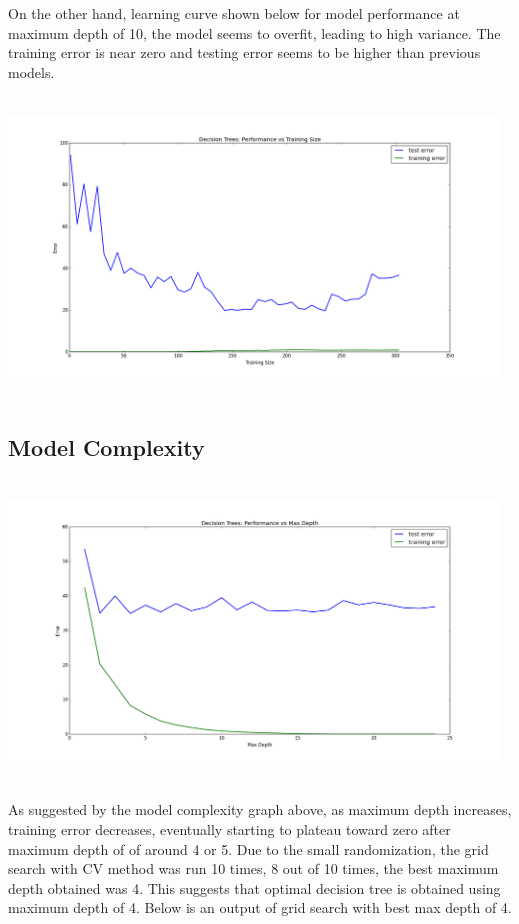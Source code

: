 \documentclass[12pt, letterpaper]{article}
\begin{document}
On the other hand, learning curve shown below for model performance at maximum depth of 10, the model seems to overfit, leading to high variance. The training error is near zero and testing error seems to be higher than previous models.

\begin{center}
\includegraphics[width=13cm,height=8cm]{DT10}
\end{center}

\newpage

\subsection{Model Complexity}

\begin{center}
\includegraphics[width=13cm,height=8cm]{Model}
\end{center}

As suggested by the model complexity graph above, as maximum depth increases, training error decreases, eventually starting to plateau toward zero after maximum depth of of around 4 or 5. Due to the small randomization, the grid search with CV method was run 10 times, 8 out of 10 times, the best maximum depth obtained was 4. This suggests that optimal decision tree is obtained using maximum depth of 4. Below is an output of grid search with best max depth of 4. 
\end{document}
